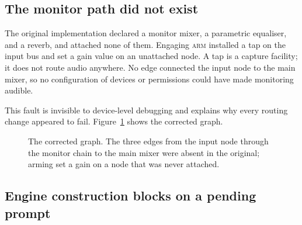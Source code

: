 \documentclass[10pt,letterpaper,twocolumn]{article}
\begin{document}
\subsection{The monitor path did not exist}

The original implementation declared a monitor mixer, a parametric equaliser, and a reverb, and attached none of them. Engaging \textsc{arm} installed a tap on the input bus and set a gain value on an unattached node. A tap is a capture facility; it does not route audio anywhere. No edge connected the input node to the main mixer, so no configuration of devices or permissions could have made monitoring audible.

This fault is invisible to device-level debugging and explains why every routing change appeared to fail. Figure~\ref{fig:graph} shows the corrected graph.

\begin{figure}[t]
\centering
{}
\caption{The corrected graph. The three edges from the input node through the monitor chain to the main mixer were absent in the original; arming set a gain on a node that was never attached.}
\label{fig:graph}
\end{figure}

\subsection{Engine construction blocks on a pending prompt}
\end{document}
